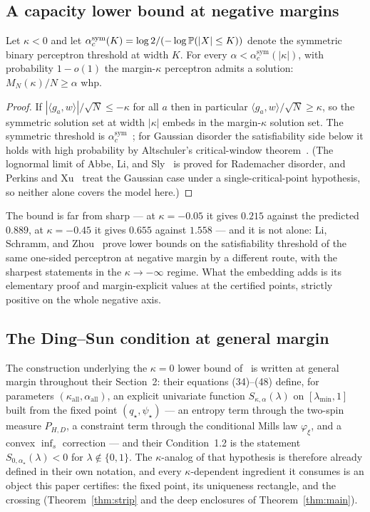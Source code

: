 \subsection{A capacity lower bound at negative margins}

\begin{prop}\label{prop:embedded}
Let $\kappa<0$ and let $\alpha^{\mathrm{sym}}_c(K)=
\log2/(-\log\mathbb{P}(|X|\le K))$ denote the symmetric binary perceptron
threshold at width $K$.  For every
$\alpha<\alpha^{\mathrm{sym}}_c(|\kappa|)$, with probability
$1-o(1)$ the margin-$\kappa$ perceptron admits a solution:
$M_N(\kappa)/N\ge\alpha$ whp.
\end{prop}

\begin{proof}
If $|\langle g_a,w\rangle|/\sqrt N\le-\kappa$ for all $a$ then in
particular $\langle g_a,w\rangle/\sqrt N\ge\kappa$, so the symmetric
solution set at width $|\kappa|$ embeds in the margin-$\kappa$
solution set.  The symmetric threshold is
$\alpha^{\mathrm{sym}}_c$~\cite{aubin2019storage}; for Gaussian
disorder the satisfiability side below it holds with high
probability by Altschuler's critical-window
theorem~\cite{altschuler2022}.  (The lognormal limit of Abbe, Li,
and Sly~\cite{abbelisly2021} is proved for Rademacher disorder, and
Perkins and Xu~\cite{perkinsxu2021} treat the Gaussian case under a
single-critical-point hypothesis, so neither alone covers the model
here.)
\end{proof}

The bound is far from sharp --- at $\kappa=-0.05$ it gives
$0.215$ against the predicted $0.889$, at $\kappa=-0.45$ it gives
$0.655$ against $1.558$ --- and it is not alone: Li, Schramm, and
Zhou~\cite{lsz2024} prove lower bounds on the satisfiability
threshold of the same one-sided perceptron at negative margin by a
different route, with the sharpest statements in the
$\kappa\to-\infty$ regime.  What the embedding adds is its
elementary proof and margin-explicit values at the certified
points, strictly positive on the whole negative axis.

\subsection{The Ding--Sun condition at general margin}

The construction underlying the $\kappa=0$ lower bound
of~\cite{ding2019capacity} is written at general margin throughout
their Section~2: their equations (34)--(48) define, for parameters
$(\kappa_{\mathrm{all}},\alpha_{\mathrm{all}})$, an explicit
univariate function $S_{\kappa,\alpha}(\lambda)$ on
$[\lambda_{\min},1]$ built from the fixed point $(q_\star,\psi_\star)$
--- an entropy term through the two-spin measure $P_{H,D}$, a
constraint term through the conditional Mills law
$\varphi_\xi$, and a convex $\inf_s$ correction --- and their
Condition~1.2 is the statement $S_{0,\alpha_\star}(\lambda)<0$ for
$\lambda\notin\{0,1\}$.  The $\kappa$-analog of that hypothesis is
therefore already defined in their own notation, and every
$\kappa$-dependent ingredient it consumes is an object this paper
certifies: the fixed point, its uniqueness rectangle, and the
crossing (Theorem~\ref{thm:strip} and the deep enclosures of
Theorem~\ref{thm:main}).


